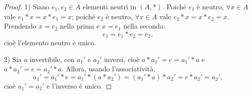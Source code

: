 \documentclass[11pt,a4paper]{article}
\begin{document}
\begin{proof}
1) Siano $e_1, e_2 \in A$ elementi neutri in $(A, *)$. Poiché $e_1$ è neutro, $\forall x \in A$ vale $e_1 * x = x * e_1 = x$; poiché $e_2$ è neutro, $\forall x \in A$ vale $e_2 * x = x * e_2 = x$. Prendendo $x = e_2$ nella prima e $x = e_1$ nella seconda:
\[
  e_1 = e_1 * e_2 = e_2 ,
\]
cioè l'elemento neutro è unico.

2) Sia $a$ invertibile, con $a_1'$ e $a_2'$ inversi, cioè $a * a_1' = e = a_1' * a$ e $a * a_2' = e = a_2' * a$. Allora, usando l'associatività,
\[
  a_1' = a_1' * e = a_1' * (a * a_2') = (a_1' * a) * a_2' = e * a_2' = a_2' ,
\]
cioè $a_1' = a_2'$ e l'inverso è unico.
\end{proof}
\end{document}
